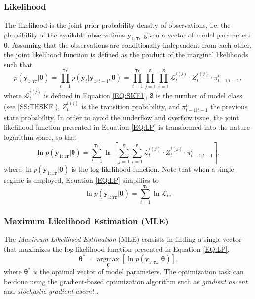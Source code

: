 \subsubsection{Likelihood}
The likelihood is the joint prior probability density of observations, i.e. the plausibility of the available observations $\mathbf{y}_{1:\mathtt{Tr}}$ given a vector of model parameters $\bm\theta$.  
Assuming that the observations are conditionally independent from each other, the joint likelihood function is defined as the product of the marginal likelihoods such that
\begin{equation}
p(\mathbf{y}_{1:\mathtt{Tr}}|\bm\theta)  = \displaystyle\prod_{t=1}^{\mathtt{Tr}} p(\mathbf{y}_{t}|\mathbf{y}_{1:t-1},\bm \theta) = \displaystyle\prod_{t=1}^{\mathtt{Tr}}\prod_{j=1}^{\mathtt{S}} \prod_{i=1}^{\mathtt{S}} \mathcal{L}_{t}^{i(j)}\cdot Z_{t}^{i(j)}\cdot\pi_{t-1|t-1}^{i} ,
\label{EQ:LP}
\end{equation}
where $\mathcal{L}_{t}^{i(j)}$ is defined in Equation \ref{EQ:SKF1}, $\mathtt{S}$ is the number of model class (see \ref{SS:THSKF}), $Z_{t}^{i(j)}$ is the transition probability, and $\pi_{t-1|t-1}^{i}$ the previous state probability. In order to avoid the underflow and overflow issue, the joint likelihood function presented in Equation \ref{EQ:LP} is transformed into the nature logarithm space, so that
\begin{equation}
\ln p(\mathbf{y}_{1:\mathtt{Tr}}|\bm\theta)  =  \displaystyle\sum_{t=1}^{\mathtt{Tr}} \ln \left[ \sum_{j=1}^{\mathtt{S}} \sum_{i=1}^{\mathtt{S}} \mathcal{L}_{t}^{i(j)}\cdot Z_{t}^{i(j)}\cdot\pi_{t-1|t-1}^{i} \right],
\label{EQ:LP}
\end{equation}
where $\ln p(\mathbf{y}_{1:\mathtt{Tr}}|\bm\theta) $ is the log-likelihood function. Note that when a single regime is employed, Equation \ref{EQ:LP} simplifies to
\begin{equation}
\ln p(\mathbf{y}_{1:\mathtt{Tr}}|\bm\theta)  =  \displaystyle\sum_{t=1}^{\mathtt{Tr}} \ln  \mathcal{L}_{t},
\end{equation}


\subsubsection{Maximum Likelihood Estimation (MLE)}

The \emph{Maximum Likelihood Estimation} (MLE) \cite{gelman2014bayesian} consists in finding a single vector that maximizes the log-likelihood function presented in Equation \ref{EQ:LP},
\begin{equation*}
\bm\theta^{*} = \underset{\bm\theta}{\text{arg}\max}\left[\ln  p(\mathbf{y}_{1:\mathtt{Tr}}|\bm\theta) \right] \text{,}
\end{equation*}
where $\bm\theta^{*}$ is the optimal vector of model parameters. The optimization task can be done using the gradient-based optimization algorithm such as \emph{gradient ascent} and \emph{stochastic gradient ascent}  \cite{Goodfellow-et-al-2016}.


